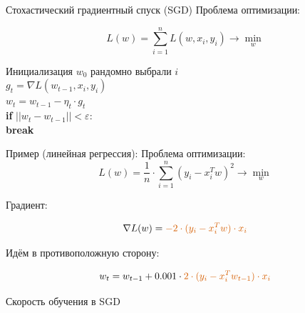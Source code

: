 \documentclass[notes,12pt, aspectratio=169]{beamer}
\newcommand{\pgr}[1]{{\color{green} \textbf{#1}}}
\begin{document}
\begin{frame}[fragile]{Стохастический градиентный спуск (SGD)}
Проблема оптимизации: 

\[   
L(w) = \sum_{i=1}^n L(w, x_i, y_i) \to \min_{w}
\]

Инициализация $w_0$ 
\hspace{15pt} рандомно выбрали $i$ \\
\pgr{\hspace{15pt}} $g_t = \nabla L(w_{t-1}, x_i, y_i)$ \\
\pgr{\hspace{15pt}} $w_t = w _{t-1} - \eta_t \cdot g_t  $ \\
\pgr{\hspace{15pt} if} $||w_t - w_{t-1}|| < \varepsilon:$ \\
\pgr{\hspace{30pt} break}
\end{frame}


\begin{frame}[fragile]{Пример (линейная регрессия):}
Проблема оптимизации: 
\[   
L(w) = \frac{1}{n} \cdot \sum_{i=1}^n  (y_i - x_i^T w)^2 \to \min_{w}
\]

Градиент: 

\[   
\nabla L(w) =  { \color{red} - 2 \cdot (y_i - x_i^T w)\cdot x_i }
\]

Идём в противоположную сторону: 

\[
w_{t}=   w_{t-1}  +  0.001 \cdot   {\color{red}  2 \cdot (y_i - x_i^T w_{t-1})\cdot x_i }
\]
\end{frame}


\begin{frame}{Скорость обучения в SGD} 
\begin{center}
	
\end{center}
\end{frame}
\end{document}
